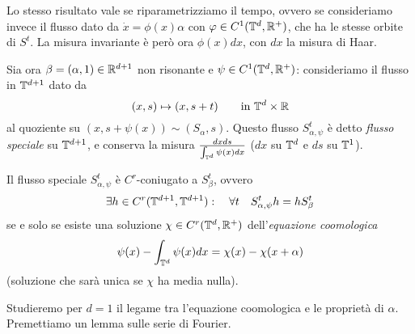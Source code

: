 Lo stesso risultato vale se riparametrizziamo il tempo, ovvero se consideriamo invece il flusso dato da $\dot x=\phi(x)\alpha$ con $\varphi\in C^1(\mathbb{T}^d,\mathbb{R}^+)$, 
che ha le stesse orbite di $S^t$. La misura invariante è però ora $\phi(x)dx$, con $dx$ la misura di Haar.

Sia ora $\beta=(\alpha,1)\in \mathbb{R}^{d+1}$ non risonante e $\psi\in C^1(\mathbb{T}^d,\mathbb{R}^+)$: consideriamo il flusso in $\mathbb{T}^{d+1}$ dato da 
\[(x,s)\mapsto(x,s+t) \qquad \mbox{in }\mathbb{T}^d\times \mathbb{R}\]
al quoziente su $(x,s+\psi(x))\sim(S_\alpha,s)$. Questo flusso $S^t_{\alpha,\psi}$ è detto \emph{flusso speciale} su $\mathbb{T}^{d+1}$, 
e conserva la misura $\frac{dxds}{\int_{\mathbb{T}^d}\psi(x)dx}$ ($dx$ su $\mathbb{T}^d$ e $ds$ su $\mathbb{T}^1$).

\begin{teo}Il flusso speciale $S^t_{\alpha,\psi}$ è $C^r$-coniugato a $S^t_\beta$, ovvero
 \[\exists h\in C^r(\mathbb{T}^{d+1},\mathbb{T}^{d+1}):\quad \forall t \quad S^t_{\alpha,\psi}h=hS^t_\beta\]
 se e solo se esiste una soluzione $\chi\in C^r(\mathbb{T}^d,\mathbb{R}^+)$ dell'\emph{equazione coomologica}
 \[\psi(x)-\int_{\mathbb{T}^d}\psi(x)dx=\chi(x)-\chi(x+\alpha)\]
 (soluzione che sarà unica se $\chi$ ha media nulla).
\end{teo}

Studieremo per $d=1$ il legame tra l'equazione coomologica e le proprietà di $\alpha$. Premettiamo un lemma sulle serie di Fourier.

